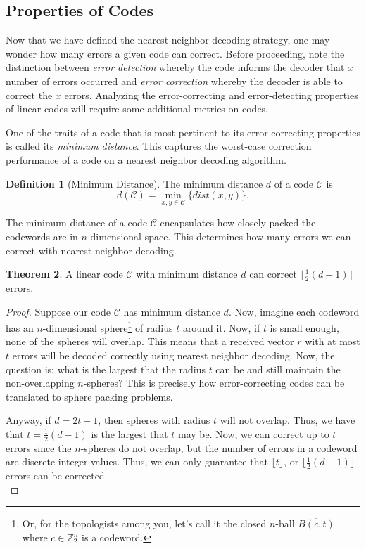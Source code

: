 \documentclass[12pt,twoside]{reedthesis}
\theoremstyle{definition}
\newtheorem{theorem}{Theorem}[chapter]
\newtheorem{definition}[theorem]{Definition}
\newcommand{\Z}{\mathbb{Z}}
\begin{document}
\subsection{Properties of Codes}
Now that we have defined the nearest neighbor decoding strategy, one may wonder how many errors a given code can correct. Before proceeding, note the distinction between \textit{error detection} whereby the code informs the decoder that $x$ number of errors occurred and \textit{error correction} whereby the decoder is able to correct the $x$ errors. Analyzing the error-correcting and error-detecting properties of linear codes will require some additional metrics on codes.

One of the traits of a code that is most pertinent to its error-correcting properties is called its \textit{minimum distance}. This captures the worst-case correction performance of a code on a nearest neighbor decoding algorithm.

\begin{definition}[Minimum Distance] The minimum distance $d$ of a code $\mathscr{C}$ is $$d(\mathscr{C}) = \min_{x,y \in \mathscr{C}} \{dist(x,y)\}.$$
\end{definition}

The minimum distance of a code $\mathscr{C}$ encapsulates how closely packed the codewords are in $n$-dimensional space. This determines how many errors we can correct with nearest-neighbor decoding.
\begin{theorem} A linear code $\mathscr{C}$ with minimum distance $d$ can correct $\lfloor \frac{1}{2} (d-1) \rfloor$ errors. 
\end{theorem}

\begin{proof}
Suppose our code $\mathscr{C}$ has minimum distance $d$. Now, imagine each codeword has an $n$-dimensional sphere\footnote{Or, for the topologists among you, let's call it the closed $n$-ball $\overline{B(c, t)}$ where $c\in \Z_2^n$ is a codeword.} of radius $t$ around it. Now, if $t$ is small enough, none of the spheres will overlap. This means that a received vector $r$ with at most $t$ errors will be decoded correctly using nearest neighbor decoding. Now, the question is: what is the largest that the radius $t$ can be and still maintain the non-overlapping $n$-spheres? This is precisely how error-correcting codes can be translated to sphere packing problems.

Anyway, if $d = 2t+1$, then spheres with radius $t$ will not overlap. Thus, we have that $t = \frac{1}{2}(d-1)$ is the largest that $t$ may be. Now, we can correct up to $t$ errors since the $n$-spheres do not overlap, but the number of errors in a codeword are discrete integer values. Thus, we can only guarantee that $\lfloor t \rfloor$, or $\lfloor \frac{1}{2} (d-1)\rfloor$ errors can be corrected.\\
\end{proof}
\end{document}
